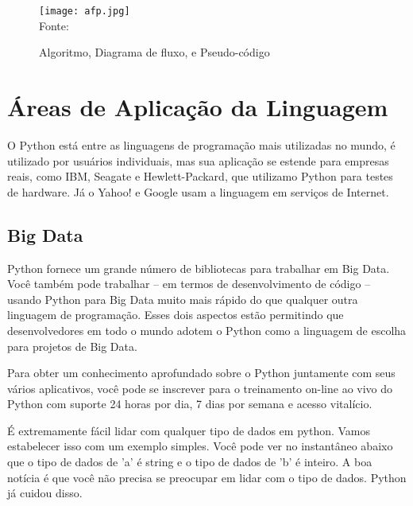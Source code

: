    \begin{figure}[H]
    \begin{center}
        \caption{Algoritmo, Diagrama de fluxo, e Pseudo-código} \label{afp}
        \texttt{[image: afp.jpg]} \\
        {\tiny \sf Fonte: \cite[p. 93]{Sprankle2012} }
    \end{center}
   \end{figure}

   \section{Áreas de Aplicação da Linguagem}
   O Python está entre as linguagens de programação mais utilizadas no mundo, é utilizado por usuários individuais, mas sua aplicação se estende para empresas reais, como IBM, Seagate e Hewlett-Packard, que utilizamo Python para testes de hardware. Já o Yahoo! e Google usam a linguagem em serviços de Internet.

        \subsection{Big Data}
        Python fornece um grande número de bibliotecas para trabalhar em Big Data. Você também pode trabalhar – em termos de desenvolvimento de código – usando Python para Big Data muito mais rápido do que qualquer outra linguagem de programação. Esses dois aspectos estão permitindo que desenvolvedores em todo o mundo adotem o Python como a linguagem de escolha para projetos de Big Data. 
        
        Para obter um conhecimento aprofundado sobre o Python juntamente com seus vários aplicativos, você pode se inscrever para o treinamento on-line ao vivo do Python com suporte 24 horas por dia, 7 dias por semana e acesso vitalício.
        
        É extremamente fácil lidar com qualquer tipo de dados em python. Vamos estabelecer isso com um exemplo simples. Você pode ver no instantâneo abaixo que o tipo de dados de 'a' é string e o tipo de dados de 'b' é inteiro. A boa notícia é que você não precisa se preocupar em lidar com o tipo de dados. Python já cuidou disso.

